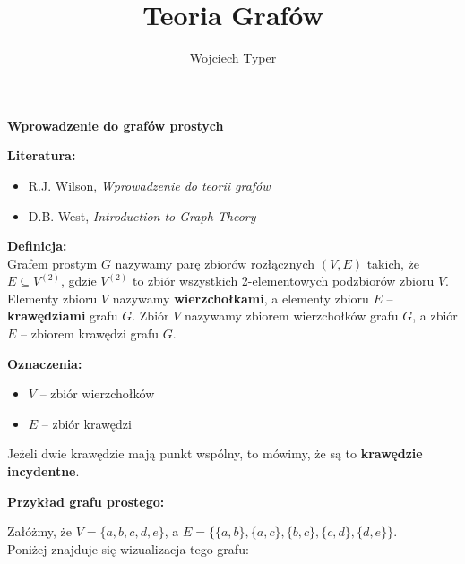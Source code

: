 \documentclass{article}
\title{Teoria Grafów}
\author{Wojciech Typer}
\date{}
\begin{document}
\maketitle

\begin{center}
    {\LARGE \textbf{Wprowadzenie do grafów prostych}}
\end{center}

\vspace{2\baselineskip}

\textbf{Literatura:}
\begin{itemize}
    \item R.J. Wilson, \textit{Wprowadzenie do teorii grafów}
    \item D.B. West, \textit{Introduction to Graph Theory}
\end{itemize}

\vspace{1\baselineskip}

\textbf{Definicja:}\\
Grafem prostym $G$ nazywamy parę zbiorów rozłącznych $(V, E)$ takich, że $E \subseteq V^{(2)}$, gdzie $V^{(2)}$ to zbiór wszystkich 2-elementowych 
podzbiorów zbioru $V$. Elementy zbioru $V$ nazywamy \textbf{wierzchołkami}, a elementy zbioru $E$ -- \textbf{krawędziami} grafu $G$. Zbiór $V$ nazywamy zbiorem wierzchołków grafu $G$, a zbiór $E$ -- zbiorem krawędzi grafu $G$.

\vspace{0.5\baselineskip}
\textbf{Oznaczenia:}
\begin{itemize}
    \item $V$ -- zbiór wierzchołków
    \item $E$ -- zbiór krawędzi
\end{itemize}

\noindent
Jeżeli dwie krawędzie mają punkt wspólny, to mówimy, że są to \textbf{krawędzie incydentne}.

\vspace{2\baselineskip}
\textbf{Przykład grafu prostego:}

Załóżmy, że $V = \{ a, b, c, d, e \}$, a $E = \{ \{a, b\}, \{a, c\}, \{b, c\}, \{c, d\}, \{d, e\} \}$.\\
Poniżej znajduje się wizualizacja tego grafu:

\begin{center}
\end{center}
\end{document}
